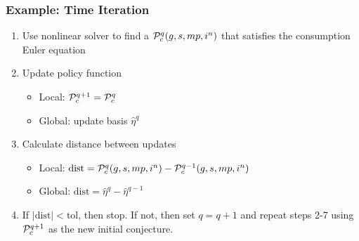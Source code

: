 \documentclass[11pt]{beamer}
\newcounter{savedenumi}
\begin{document}
\begin{frame}\frametitle{Example: Time Iteration}

\begin{enumerate}
  \setcounter{enumi}{\value{savedenumi}}
  \item<1-|handout:1> Use nonlinear solver to find a ${\cal P}_c^q(g,s,mp,i^n)$ that satisfies the consumption Euler equation%
  \item<2-|handout:1> Update policy function \label{update}
  \begin{itemize}
    \item Local: ${\cal P}_c^{q+1}={\cal P}_c^q$
    \item Global: update basis $\hat{\eta}^q$  %
  \end{itemize}
  \item<3-|handout:1> Calculate distance between updates
  \begin{itemize}
    \item Local: $\textrm{dist} = {\cal P}_c^q(g,s,mp,i^n) - {\cal P}_c^{q-1}(g,s,mp,i^n)$
    \item Global: $\textrm{dist} = \hat{\eta}^q - \hat{\eta}^{q-1}$
  \end{itemize}
  \item<4-|handout:1> If $|\textrm{dist}| < \textrm{tol}$, then stop. If not, then set $q=q+1$ and repeat steps 2-7 using ${\cal P}_c^{q+1}$ as the new initial conjecture. \label{tol criterion}
\end{enumerate}
\end{frame}

\end{document}
